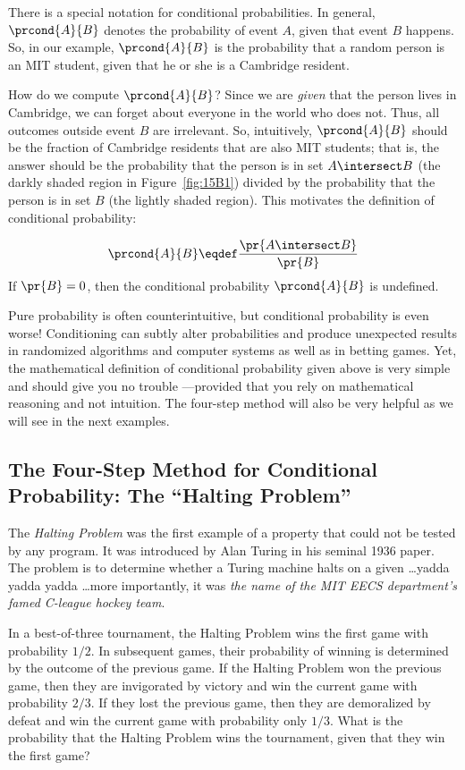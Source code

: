 There is a special notation for conditional probabilities.  In
general, $\prcond{A}{B}$ denotes the probability of event $A$, given
that event $B$ happens.  So, in our example, $\prcond{A}{B}$ is the
probability that a random person is an MIT student, given that he or
she is a Cambridge resident.

How do we compute $\prcond{A}{B}$?  Since we are \emph{given} that the
person lives in Cambridge, we can forget about everyone in the world
who does not.  Thus, all outcomes outside event $B$ are irrelevant.
So, intuitively, $\prcond{A}{B}$ should be the fraction of Cambridge
residents that are also MIT students; that is, the answer should be
the probability that the person is in set $A \intersect B$ (the darkly
shaded region in Figure~\ref{fig:15B1}) divided by the probability
that the person is in set $B$ (the lightly shaded region).  This
motivates the definition of conditional probability:
\begin{definition}\label{LN12:prcond}
\[
\prcond{A}{B} \eqdef \frac{\pr{A \intersect B}}{\pr{B}}
\]
If $\pr{B} = 0$, then the conditional probability $\prcond{A}{B}$ is
undefined.
\end{definition}

Pure probability is often counterintuitive, but conditional
probability is even worse!  Conditioning can subtly alter
probabilities and produce unexpected results in randomized algorithms
and computer systems as well as in betting games.  Yet, the
mathematical definition of conditional probability given above is very
simple and should give you no trouble ---provided that you rely on
mathematical reasoning and not intuition.  The four-step method will
also be very helpful as we will see in the next examples.

\subsection{The Four-Step Method for Conditional
  Probability: The ``Halting Problem''}

The \emph{Halting Problem} was the first example of a property that
could not be tested by any program.  It was introduced by Alan Turing
in his seminal 1936 paper.  The problem is to determine whether a
Turing machine halts on a given \dots yadda yadda yadda \dots more
importantly, it was \emph{the name of the MIT EECS department's famed
  C-league hockey team}.

In a best-of-three tournament, the Halting Problem wins the first game
with probability $1/2$.  In subsequent games, their
probability of winning is determined by the outcome of the previous
game.  If the Halting Problem won the previous game, then they are
invigorated by victory and win the current game with probability
$2/3$.  If they lost the previous game, then they are
demoralized by defeat and win the current game with probability only
$1/3$.  What is the probability that the Halting Problem wins
the tournament, given that they win the first game?


